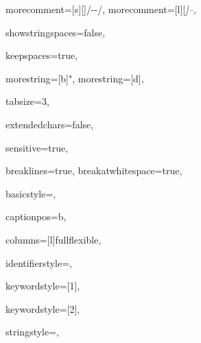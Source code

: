 {%
morecomment=[s][\color{commentcolor}]{/-}{-/},
morecomment=[l][\itshape \color{commentcolor}]{--},

showstringspaces=false,

keepspaces=true,

morestring=[b]",
morestring=[d],

tabsize=3,

extendedchars=false,

sensitive=true,

breaklines=true,
breakatwhitespace=true,

basicstyle=\ttfamily\small,

captionpos=b,

columns=[l]fullflexible,


identifierstyle={\ttfamily\color{black}},

keywordstyle=[1]{\ttfamily\color{keywordcolor}},

keywordstyle=[2]{\ttfamily\color{sortcolor}},



stringstyle=\ttfamily,


}
